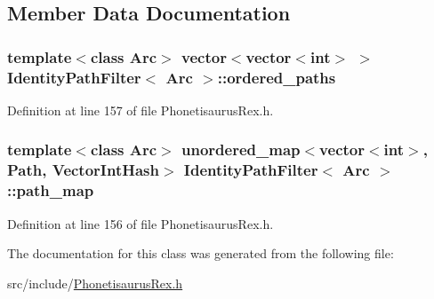 \subsection{Member Data Documentation}
\subsubsection[{ordered\+\_\+paths}]{\setlength{\rightskip}{0pt plus 5cm}template$<$class Arc$>$ vector$<$vector$<$int$>$ $>$ {\bf Identity\+Path\+Filter}$<$ Arc $>$\+::ordered\+\_\+paths}\hypertarget{class_identity_path_filter_a098380024b6d4053f84dce6e6257c04a}{}\label{class_identity_path_filter_a098380024b6d4053f84dce6e6257c04a}


Definition at line 157 of file Phonetisaurus\+Rex.\+h.

\subsubsection[{path\+\_\+map}]{\setlength{\rightskip}{0pt plus 5cm}template$<$class Arc$>$ unordered\+\_\+map$<$vector$<$int$>$, {\bf Path}, {\bf Vector\+Int\+Hash}$>$ {\bf Identity\+Path\+Filter}$<$ Arc $>$\+::path\+\_\+map}\hypertarget{class_identity_path_filter_a385113c7ceaae43ac23dfe7982cf5990}{}\label{class_identity_path_filter_a385113c7ceaae43ac23dfe7982cf5990}


Definition at line 156 of file Phonetisaurus\+Rex.\+h.



The documentation for this class was generated from the following file\+:\begin{DoxyCompactItemize}
\item 
src/include/\hyperlink{_phonetisaurus_rex_8h}{Phonetisaurus\+Rex.\+h}\end{DoxyCompactItemize}
